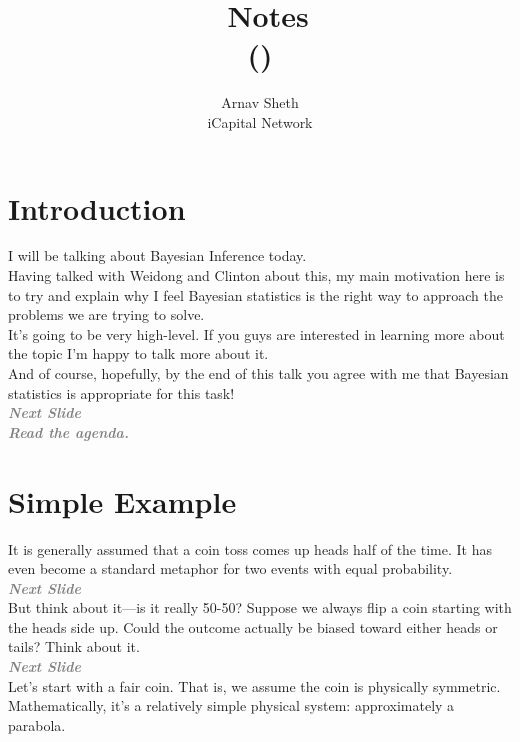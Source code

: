 \documentclass[14pt]{extarticle}
\title{\Large \lecturenumber ~Notes \\
\large \classname ({\small \classno})}
\author{\normalsize Arnav Sheth \\ \normalsize iCapital Network}
\date{\normalsize \classdate} %
\newcommand{\mynotes}[2][Gray]{\textcolor{#1}{\textbf{\textit{#2}}}}
\begin{document}
	
\maketitle

\tableofcontents

\section{Introduction}

I will be talking about Bayesian Inference today. \\

Having talked with Weidong and Clinton about this, my main motivation here is to try and explain why I feel Bayesian statistics is the right way to approach the problems we are trying to solve. \\

It's going to be very high-level. If you guys are interested in learning more about the topic I'm happy to talk more about it. \\

And of course, hopefully, by the end of this talk you agree with me that Bayesian statistics is appropriate for this task! \\

\mynotes{Next Slide} \\

\mynotes{Read the agenda.}

\section{Simple Example}

It is generally assumed that a coin toss comes up heads half of the time. It has even become a standard metaphor for two events with equal probability. \\

\mynotes{Next Slide} \\

But think about it—is it really 50-50? Suppose we always flip a coin starting with the heads side up. Could the outcome actually be biased toward either heads or tails? Think about it. \\

\mynotes{Next Slide} \\

Let's start with a fair coin. That is, we assume the coin is physically symmetric. Mathematically, it's a relatively simple physical system: approximately a parabola. \\
\end{document}

